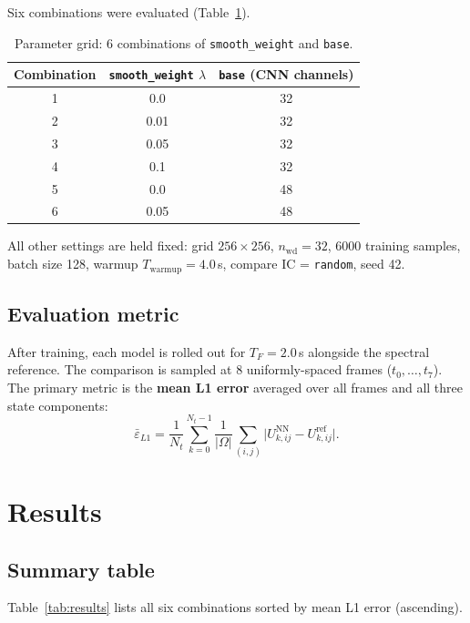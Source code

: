 \documentclass[11pt,a4paper]{article}
\begin{document}
Six combinations were evaluated (Table~\ref{tab:grid}).

\begin{table}[H]
  \centering
  \caption{Parameter grid: 6 combinations of \texttt{smooth\_weight} and \texttt{base}.}
  \label{tab:grid}
  \begin{tabular}{ccc}
    \toprule
    Combination & \texttt{smooth\_weight} $\lambda$ & \texttt{base} (CNN channels) \\
    \midrule
    1 & 0.0  & 32 \\
    2 & 0.01 & 32 \\
    3 & 0.05 & 32 \\
    4 & 0.1  & 32 \\
    5 & 0.0  & 48 \\
    6 & 0.05 & 48 \\
    \bottomrule
  \end{tabular}
\end{table}

All other settings are held fixed: grid $256\times256$, $n_{\mathrm{wd}}=32$, 6000 training samples,
batch size 128, warmup $T_{\mathrm{warmup}}=4.0$\,s, compare IC = \texttt{random}, seed 42.

\subsection{Evaluation metric}

After training, each model is rolled out for $T_F = 2.0$\,s alongside the spectral reference.
The comparison is sampled at 8 uniformly-spaced frames ($t_0,\ldots,t_7$).
The primary metric is the \textbf{mean L1 error} averaged over all frames and all three state components:
\begin{equation}
  \bar{\varepsilon}_{L1} = \frac{1}{N_t}\sum_{k=0}^{N_t-1}
  \frac{1}{|\Omega|}\sum_{(i,j)} \bigl\lvert U^{\mathrm{NN}}_{k,ij} - U^{\mathrm{ref}}_{k,ij}\bigr\rvert.
\end{equation}

\section{Results}

\subsection{Summary table}

Table~\ref{tab:results} lists all six combinations sorted by mean L1 error (ascending).
\end{document}
